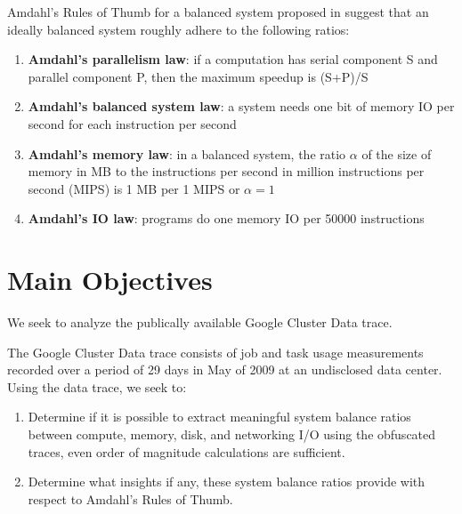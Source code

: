 \documentclass[a0,portrait]{a0poster}
\begin{document}
\begin{multicols}{2}
\noindent Amdahl's Rules of Thumb for a balanced system proposed in suggest that an ideally balanced system roughly adhere to the following ratios: \\
\begin{enumerate}
\item \textbf{Amdahl's parallelism law}: if a computation has serial component S and parallel component P, then the maximum speedup is (S+P)/S \\
\item \textbf{Amdahl's balanced system law}: a system needs one bit of memory IO per second for each instruction per second \\
\item \textbf{Amdahl's memory law}: in a balanced system, the ratio $\alpha$ of the size of memory in MB to the instructions per second in million instructions per second (MIPS) is 1 MB per 1 MIPS or $\alpha = 1$ \\
\item \textbf{Amdahl's IO law}: programs do one memory IO per 50000 instructions
\end{enumerate}


\color{DarkSlateGray} %

\section*{Main Objectives}

We seek to analyze the publically available Google Cluster Data trace.

The Google Cluster Data trace consists of job and task usage measurements recorded over a period of 29 days in May of 2009 at an undisclosed data center. 
Using the data trace, we seek to:

\begin{enumerate}
\item[1] Determine if it is possible to extract meaningful system balance ratios between compute, memory, disk, and networking I/O using the obfuscated traces, even order of magnitude calculations are sufficient.
\item[2] Determine what insights if any, these system balance ratios provide with respect to Amdahl's Rules of Thumb.
\end{enumerate}


\end{multicols}
\end{document}
